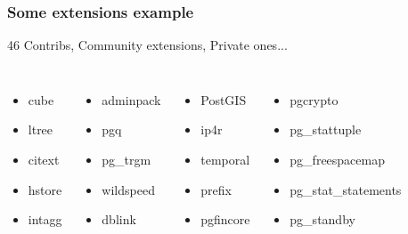 \documentclass[english]{beamer}
\begin{document}
\begin{frame}[fragile]
  \frametitle{Some extensions example}

  \begin{center}
    46 Contribs, Community extensions, Private ones...
  \end{center}

\begin{columns}[c]

  \begin{itemize}
   \item cube
   \item ltree
   \item citext
   \item \alert{hstore}
   \item intagg
  \end{itemize}

  \begin{itemize}
   \item adminpack
   \item \alert{pgq}
   \item pg\_trgm
   \item wildspeed
   \item \alert{dblink}
  \end{itemize}

  \begin{itemize}
   \item \alert{PostGIS}
   \item ip4r
   \item temporal
   \item prefix
   \item pgfincore
  \end{itemize}

  \begin{itemize}
   \item pgcrypto
   \item pg\_stattuple
   \item pg\_freespacemap
   \item pg\_stat\_statements
   \item \alert{pg\_standby}
  \end{itemize}

\end{columns}
\end{frame}

\end{document}
